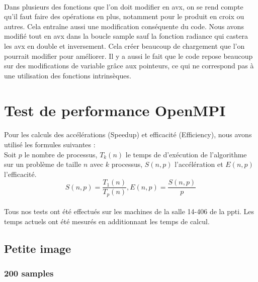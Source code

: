 \documentclass{article}
\begin{document}
\paragraph{}
Dans plusieurs des fonctions que l'on doit modifier en avx, on se rend compte qu'il faut faire des op\'erations en plus, notamment pour le produit en croix ou autres.
Cela entra\^ine aussi une modification cons\'equente du code. Nous avons modifi\'e tout en avx dans la boucle sample sauf la fonction radiance qui castera les avx en double et inversement.
Cela cr\'eer beaucoup de chargement que l'on pourrait modifier pour am\'eliorer. Il y a aussi le fait que le code repose beaucoup sur des modifications de variable gr\^ace aux pointeurs, ce qui
ne correspond pas \`a une utilisation des fonctions intrins\`eques.


\newpage

\appendix
\section{Test de performance OpenMPI}

\label{temps partie1}

\paragraph{}
Pour les calculs des accélérations (Speedup) et efficacité (Efficiency), 
nous avons utilisé les formules suivantes : \\
Soit $p$ le nombre de processus,
$T_k(n)$ le temps de d'exécution de l'algorithme sur un problème de taille $n$ avec $k$ processus,
$S(n,p)$ l'accélération et $E(n,p)$ l'efficacité.
$$
  S(n,p) = \frac{T_1(n)}{T_p(n)}
  ,
  E(n,p) = \frac{S(n,p)}{p}
$$

\paragraph{}
Tous nos tests ont été effectués sur les machines de la salle 14-406 de la ppti.
Les temps actuels ont \'et\'e mesur\'es en additionnant les temps de calcul.

\subsection{Petite image}

\subsubsection{200 samples}
\end{document}
